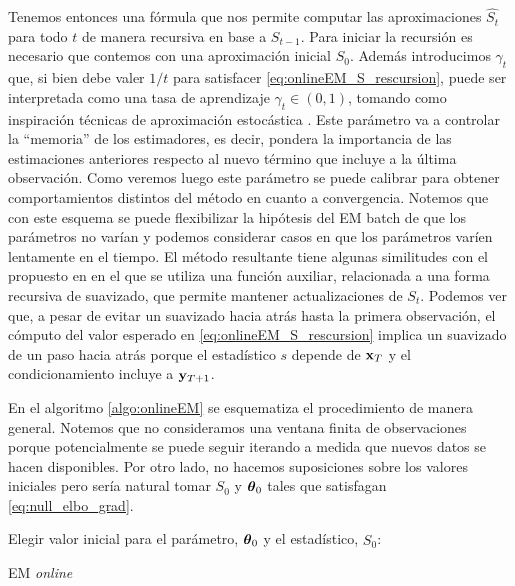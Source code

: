 Tenemos entonces una fórmula que nos permite computar las aproximaciones $\widehat{S_t}$ para todo $t$ de manera recursiva en base a $S_{t-1}$. Para iniciar la recursión es necesario que contemos con una aproximación inicial $S_0$. Además introducimos $\gamma_t$ que, si bien debe valer $1/t$ para satisfacer \ref{eq:onlineEM_S_rescursion}, puede ser interpretada como una tasa de aprendizaje $\gamma_t \in (0, 1)$, tomando como inspiración técnicas de aproximación estocástica \cite{Legland1997}. Este parámetro va a controlar la ``memoria'' de los estimadores, es decir, pondera la importancia de las estimaciones anteriores respecto al nuevo término que incluye a la última observación. Como veremos luego este parámetro se puede calibrar para obtener comportamientos distintos del método en cuanto a convergencia. Notemos que con este esquema se puede flexibilizar la hipótesis del EM batch de que los parámetros no varían y podemos considerar casos en que los parámetros varíen lentamente en el tiempo. El método resultante tiene algunas similitudes con el propuesto en \cite{Cappe2009} en el que se utiliza una función auxiliar, relacionada a una forma recursiva de suavizado, que permite mantener actualizaciones de $S_t$. Podemos ver que, a pesar de evitar un suavizado hacia atrás hasta la primera observación, el cómputo del valor esperado en \ref{eq:onlineEM_S_rescursion} implica un suavizado de un paso hacia atrás porque el estadístico $s$ depende de $\mathbf{x}_T$ y el condicionamiento incluye a $\mathbf{y}_{T+1}$. 

En el algoritmo \ref{algo:onlineEM} se esquematiza el procedimiento de manera general. Notemos que no consideramos una ventana finita de observaciones porque potencialmente se puede seguir iterando a medida que nuevos datos se hacen disponibles. Por otro lado, no hacemos suposiciones sobre los valores iniciales pero sería natural tomar $S_0$ y $\mbox{\boldmath$ \theta $}_0$ tales que satisfagan \ref{eq:null_elbo_grad}.

\begin{algorithm}[H]\label{algo:onlineEM}
    Elegir valor inicial para el parámetro, $\mbox{\boldmath$ \theta $}_0$ y el estadístico, $\widehat{S_0}$: \\
        \caption{EM \textit{online}}
\end{algorithm}

